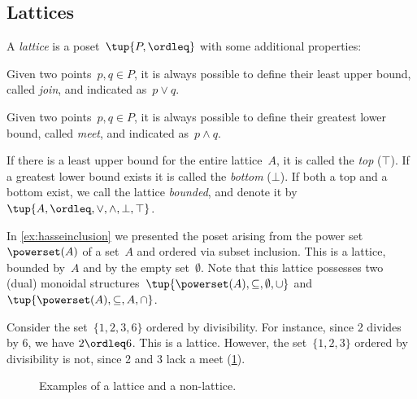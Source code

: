 \subsection{Lattices}
\begin{definition}[Lattice]
\label{def:lattice}
A \emph{lattice} is a poset~$\tup{P, \ordleq}$ with some additional properties:
\begin{compactenum}
    \item Given two points~$p, q \in P$, it is always possible to define their least upper bound, called \emph{join}, and indicated as~$p \vee q$.
    \item Given two points~$p, q \in P$, it is always possible to define their greatest lower bound, called \emph{meet}, and indicated as~$p \wedge q$.
\end{compactenum}
\end{definition}

\begin{remark}
If there is a least upper bound for the entire lattice~$A$, it is called
the \emph{top} ($\top$). If a greatest lower bound exists it is called the \emph{bottom} ($\bot$). If both a top and a bottom exist, we call the lattice \emph{bounded}, and denote it by~$\tup{A,\ordleq,\vee,\wedge,\bot,\top}$.
\end{remark}

\begin{example}
    In \cref{ex:hasseinclusion} we presented the poset arising from the power set~$\powerset(A)$ of a set~$A$ and ordered via subset inclusion. This is a lattice, bounded by~$A$ and by the empty set~$\emptyset$. Note that this lattice possesses two (dual) monoidal structures~$\tup{\powerset(A),\subseteq,\emptyset,\cup}$ and~$\tup{\powerset(A),\subseteq,A,\cap}$.
\end{example}

\begin{example}
Consider the set~$\{1,2,3,6\}$ ordered by divisibility. For instance, since 2 divides by 6, we have $2\ordleq 6$. This is a lattice. However, the set~$\{1,2,3\}$ ordered by divisibility is not, since 2 and 3 lack a meet (\cref{fig:exlattice}).
\begin{figure}[h!]
\begin{center}
\end{center}
\caption{Examples of a lattice and a non-lattice. \label{fig:exlattice}}
\end{figure}
\end{example}

